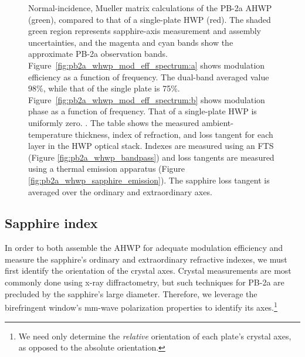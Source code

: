 \begin{figure}[!t]
    \caption[The modulation efficiency and phase for the PB-2a HWP, compared to that of a single-plate HWP.]{Normal-incidence, Mueller matrix calculations of the PB-2a AHWP (green), compared to that of a single-plate HWP (red). The shaded green region represents sapphire-axis measurement and assembly uncertainties, and the magenta and cyan bands show the approximate PB-2a observation bands. Figure~\ref{fig:pb2a_whwp_mod_eff_spectrum:a}  shows modulation efficiency as a function of frequency. The dual-band averaged value 98\%, while that of the single plate is 75\%. Figure~\ref{fig:pb2a_whwp_mod_eff_spectrum:b} shows modulation phase as a function of frequency. That of a single-plate HWP is uniformly zero. \cite{hill_design_2016}. The table shows the measured ambient-temperature thickness, index of refraction, and loss tangent for each layer in the HWP optical stack. Indexes are measured using an FTS (Figure \ref{fig:pb2a_whwp_bandpass}) and loss tangents are measured using a thermal emission apparatus (Figure \ref{fig:pb2a_whwp_sapphire_emission}). The sapphire loss tangent is averaged over the ordinary and extraordinary axes.}
    \label{fig:pb2a_whwp_mod_eff_spectrum}
\end{figure}


\subsection{Sapphire index}
\label{sec:pb2a_whwp_sapphire_index}

In order to both assemble the AHWP for adequate modulation efficiency and measure the sapphire's ordinary and extraordinary refractive indexes, we must first identify the orientation of the crystal axes. Crystal measurements are most commonly done using x-ray diffractometry, but such techniques for PB-2a are precluded by the sapphire's large diameter. Therefore, we leverage the birefringent window's mm-wave polarization properties to identify its axes.\footnote{We need only determine the \textit{relative} orientation of each plate's crystal axes, as opposed to the absolute orientation.}

